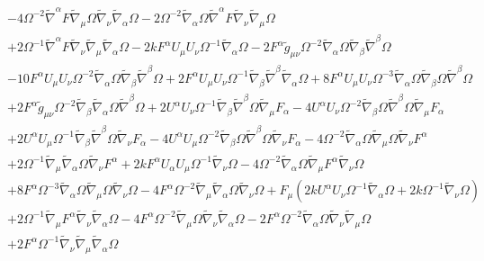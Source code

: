 \documentclass[10pt,letterpaper]{article}
\numberwithin{equation}{section}
\begin{document}
\begin{eqnarray}
&& - 4 \Omega^{-2} \tilde{\nabla}^{\alpha }F \tilde{\nabla}_{\mu }\Omega \tilde{\nabla}_{\nu }\tilde{\nabla}_{\alpha }\Omega - 2 \Omega^{-2} \tilde{\nabla}_{\alpha }\Omega \tilde{\nabla}^{\alpha }F \tilde{\nabla}_{\nu }\tilde{\nabla}_{\mu }\Omega \nonumber \\ 
&& + 2 \Omega^{-1} \tilde{\nabla}^{\alpha }F \tilde{\nabla}_{\nu }\tilde{\nabla}_{\mu }\tilde{\nabla}_{\alpha }\Omega -2 k F^{\alpha } U_{\mu } U_{\nu } \Omega^{-1} \tilde{\nabla}_{\alpha }\Omega - 2 F^{\alpha } \tilde{g}_{\mu \nu } \Omega^{-2} \tilde{\nabla}_{\alpha }\Omega \tilde{\nabla}_{\beta }\tilde{\nabla}^{\beta }\Omega \nonumber \\ 
&& - 10 F^{\alpha } U_{\mu } U_{\nu } \Omega^{-2} \tilde{\nabla}_{\alpha }\Omega \tilde{\nabla}_{\beta }\tilde{\nabla}^{\beta }\Omega + 2 F^{\alpha } U_{\mu } U_{\nu } \Omega^{-1} \tilde{\nabla}_{\beta }\tilde{\nabla}^{\beta }\tilde{\nabla}_{\alpha }\Omega + 8 F^{\alpha } U_{\mu } U_{\nu } \Omega^{-3} \tilde{\nabla}_{\alpha }\Omega \tilde{\nabla}_{\beta }\Omega \tilde{\nabla}^{\beta }\Omega \nonumber \\ 
&& + 2 F^{\alpha } \tilde{g}_{\mu \nu } \Omega^{-2} \tilde{\nabla}_{\beta }\tilde{\nabla}_{\alpha }\Omega \tilde{\nabla}^{\beta }\Omega + 2 U^{\alpha } U_{\nu } \Omega^{-1} \tilde{\nabla}_{\beta }\tilde{\nabla}^{\beta }\Omega \tilde{\nabla}_{\mu }F_{\alpha } - 4 U^{\alpha } U_{\nu } \Omega^{-2} \tilde{\nabla}_{\beta }\Omega \tilde{\nabla}^{\beta }\Omega \tilde{\nabla}_{\mu }F_{\alpha } \nonumber \\ 
&& + 2 U^{\alpha } U_{\mu } \Omega^{-1} \tilde{\nabla}_{\beta }\tilde{\nabla}^{\beta }\Omega \tilde{\nabla}_{\nu }F_{\alpha } - 4 U^{\alpha } U_{\mu } \Omega^{-2} \tilde{\nabla}_{\beta }\Omega \tilde{\nabla}^{\beta }\Omega \tilde{\nabla}_{\nu }F_{\alpha } - 4 \Omega^{-2} \tilde{\nabla}_{\alpha }\Omega \tilde{\nabla}_{\mu }\Omega \tilde{\nabla}_{\nu }F^{\alpha } \nonumber \\ 
&& + 2 \Omega^{-1} \tilde{\nabla}_{\mu }\tilde{\nabla}_{\alpha }\Omega \tilde{\nabla}_{\nu }F^{\alpha } + 2 k F^{\alpha } U_{\alpha } U_{\mu } \Omega^{-1} \tilde{\nabla}_{\nu }\Omega - 4 \Omega^{-2} \tilde{\nabla}_{\alpha }\Omega \tilde{\nabla}_{\mu }F^{\alpha } \tilde{\nabla}_{\nu }\Omega \nonumber \\ 
&& + 8 F^{\alpha } \Omega^{-3} \tilde{\nabla}_{\alpha }\Omega \tilde{\nabla}_{\mu }\Omega \tilde{\nabla}_{\nu }\Omega - 4 F^{\alpha } \Omega^{-2} \tilde{\nabla}_{\mu }\tilde{\nabla}_{\alpha }\Omega \tilde{\nabla}_{\nu }\Omega + F_{\mu } (2 k U^{\alpha } U_{\nu } \Omega^{-1} \tilde{\nabla}_{\alpha }\Omega + 2 k \Omega^{-1} \tilde{\nabla}_{\nu }\Omega) \nonumber \\ 
&& + 2 \Omega^{-1} \tilde{\nabla}_{\mu }F^{\alpha } \tilde{\nabla}_{\nu }\tilde{\nabla}_{\alpha }\Omega - 4 F^{\alpha } \Omega^{-2} \tilde{\nabla}_{\mu }\Omega \tilde{\nabla}_{\nu }\tilde{\nabla}_{\alpha }\Omega - 2 F^{\alpha } \Omega^{-2} \tilde{\nabla}_{\alpha }\Omega \tilde{\nabla}_{\nu }\tilde{\nabla}_{\mu }\Omega \nonumber \\ 
&& + 2 F^{\alpha } \Omega^{-1} \tilde{\nabla}_{\nu }\tilde{\nabla}_{\mu }\tilde{\nabla}_{\alpha }\Omega 
\end{eqnarray}
\end{document}

